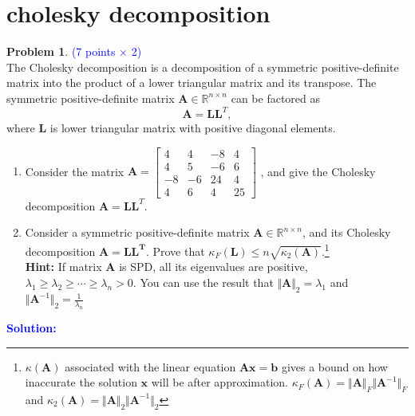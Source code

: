 \documentclass[english,onecolumn]{IEEEtran}
\begin{document}
\section{cholesky decomposition  }

\noindent\textbf{Problem 1}. \textcolor{blue}{(7 points $\times$ 2)}\\
The Cholesky  decomposition  is a decomposition of a symmetric positive-definite  matrix  into the product of a lower triangular matrix and its transpose.
The  symmetric positive-definite matrix $\mathbf{A} \in \mathbb{R}^{n \times n}$ can be factored as 
 $$ \mathbf{A} = \mathbf{L} \mathbf{L}^T ,$$
 where   $\mathbf{L} $ is lower triangular matrix with positive diagonal elements.\\

\begin{enumerate}
   
    \item Consider the matrix $\mathbf{A} = \begin{bmatrix}
 4 & 4 & -8 & 4 \\ 
 4 & 5 & -6 & 6 \\ 
 -8 & -6 & 24 & 4\\ 
 4 & 6 & 4 & 25
\end{bmatrix}$ , and  give the Cholesky  decomposition $\mathbf{A} = \mathbf{\mathbf{LL}}^T$.

   \item Consider a symmetric positive-definite matrix $\mathbf{A} \in \mathbb{R}^{n \times n}$, and its Cholesky  decomposition $\mathbf{A} = \mathbf{LL^T}$.  Prove that $\kappa_{F}(\mathbf{L}) \leq n\sqrt{\kappa_2(\mathbf{A})}$.\footnote{  $\kappa(\mathbf{A})$ associated with the linear equation $\mathbf{Ax} =\mathbf{b}$ gives a bound on how inaccurate the solution $\mathbf{x}$ will be after approximation. $\kappa_F(\mathbf{A}) =  \Vert \mathbf{A} \Vert_F \Vert\mathbf{A}^{-1} \Vert_F $  and 
  $\kappa_2(\mathbf{A}) =  \Vert \mathbf{A} \Vert_2 \Vert\mathbf{A}^{-1} \Vert_2 $ }\\ 
  \textbf{Hint:}  If  matrix $\mathbf{A}$ is SPD, all its eigenvalues are positive, $\lambda_1 \geq \lambda_2 \geq \cdots \geq \lambda_n >0$. You can use the result that  $\Vert \mathbf{A} \Vert_2 = \lambda_1 $ and $\Vert \mathbf{A}^{-1} \Vert_2 = \frac{1}{\lambda_n}$
   
  
\end{enumerate}

\noindent\textcolor{blue}{
	\textbf{Solution:}
}

\newpage
\end{document}
